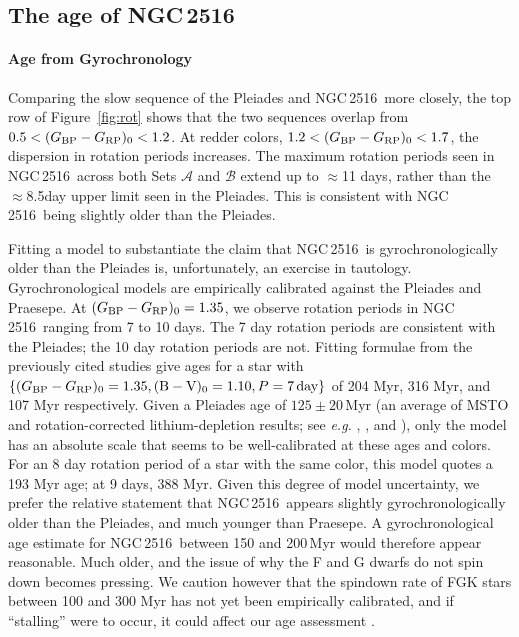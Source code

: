 \documentclass[12pt,twocolumn,tighten]{aastex63}
\newcommand{\cn}{NGC\,2516} %
\newcommand{\bpmrpo}{(G_{\rm BP}-G_{\rm RP})_0}
\begin{document}
\subsection{The age of NGC\,2516}
\label{disc:absage}


\paragraph{Age from Gyrochronology}
Comparing the slow sequence of the Pleiades and \cn\ more closely, the
top row of Figure~\ref{fig:rot} shows that the two sequences overlap
from $0.5<\bpmrpo<1.2$.  At redder colors, $1.2<\bpmrpo<1.7$, the
dispersion in rotation periods increases.  The maximum rotation
periods seen in \cn\ across both Sets $\mathcal{A}$ and $\mathcal{B}$
extend up to $\approx$11 days, rather than the $\approx$8.5day upper
limit seen in the Pleiades.  This is consistent with \cn\ being
slightly older than the Pleiades.

Fitting a model to substantiate the claim that \cn\ is
gyrochronologically older than the Pleiades \citep[{\it e.g.},][]{mamajek_improved_2008,angus_toward_2019,spada_competing_2020}
is, unfortunately, an exercise in tautology.  Gyrochronological models
are empirically calibrated against the Pleiades and Praesepe.  At
$\bpmrpo=1.35$, we observe rotation periods in \cn\ ranging from 7 to
10 days.  The 7 day rotation periods are consistent with the Pleiades;
the 10 day rotation periods are not.  Fitting formulae from the
previously cited studies give ages for a star with $\{\bpmrpo=1.35,
(\mathrm{B}-\mathrm{V})_0=1.10, P=7\,{\rm day}\}$ of 204 Myr, 316 Myr,
and 107 Myr respectively.  Given a Pleiades age of $125\pm20$\,Myr (an
average of MSTO and rotation-corrected lithium-depletion results; see
{\it e.g.} \citealt{stauffer_keck_1998},
\citealt{soderblom_ages_2014}, and \citealt{cummings_2018}), only the
\citet{spada_competing_2020} model has an absolute scale that seems to
be well-calibrated at these ages and colors.  For an 8 day rotation
period of a star with the same color, this model quotes a 193 Myr age;
at 9 days, 388 Myr.  Given this degree of model uncertainty, we prefer
the relative statement that \cn\ appears slightly gyrochronologically
older than the Pleiades, and much younger than Praesepe.  A
gyrochronological age estimate for \cn\ between 150 and 200\,Myr would
therefore appear reasonable.  Much older, and the issue of why the F
and G dwarfs do not spin down becomes pressing.  We caution however
that the spindown rate of FGK stars between 100 and 300 Myr has not
yet been empirically calibrated, and if ``stalling'' were to occur, it
could affect our age assessment \citep[see][]{curtis_rup147_2020}.
\end{document}
